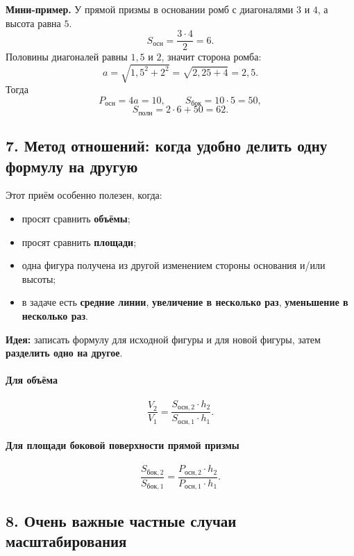 \documentclass[a4paper,12pt]{article}
\newcommand{\Area}{S}
\newcommand{\Vol}{V}
\newcommand{\per}{P}
\begin{document}
\textbf{Мини-пример.} У прямой призмы в основании ромб с диагоналями $3$ и $4$, а высота равна $5$.
\[
\Area_{\text{осн}}=\frac{3\cdot 4}{2}=6.
\]
Половины диагоналей равны $1{,}5$ и $2$, значит сторона ромба:
\[
a=\sqrt{1{,}5^2+2^2}=\sqrt{2{,}25+4}=2{,}5.
\]
Тогда
\[
\per_{\text{осн}}=4a=10,
\qquad
\Area_{\text{бок}}=10\cdot 5=50,
\]
\[
\Area_{\text{полн}}=2\cdot 6+50=62.
\]

\subsection*{7. Метод отношений: когда удобно делить одну формулу на другую}

Этот приём особенно полезен, когда:
\begin{itemize}
    \item просят сравнить \textbf{объёмы};
    \item просят сравнить \textbf{площади};
    \item одна фигура получена из другой изменением стороны основания и/или высоты;
    \item в задаче есть \textbf{средние линии}, \textbf{увеличение в несколько раз}, \textbf{уменьшение в несколько раз}.
\end{itemize}

\textbf{Идея:} записать формулу для исходной фигуры и для новой фигуры, затем \textbf{разделить одно на другое}.

\paragraph{Для объёма}
\[
\frac{\Vol_2}{\Vol_1}
=
\frac{\Area_{\text{осн},2}\cdot h_2}{\Area_{\text{осн},1}\cdot h_1}.
\]

\paragraph{Для площади боковой поверхности прямой призмы}
\[
\frac{\Area_{\text{бок},2}}{\Area_{\text{бок},1}}
=
\frac{\per_{\text{осн},2}\cdot h_2}{\per_{\text{осн},1}\cdot h_1}.
\]

\subsection*{8. Очень важные частные случаи масштабирования}
\end{document}
